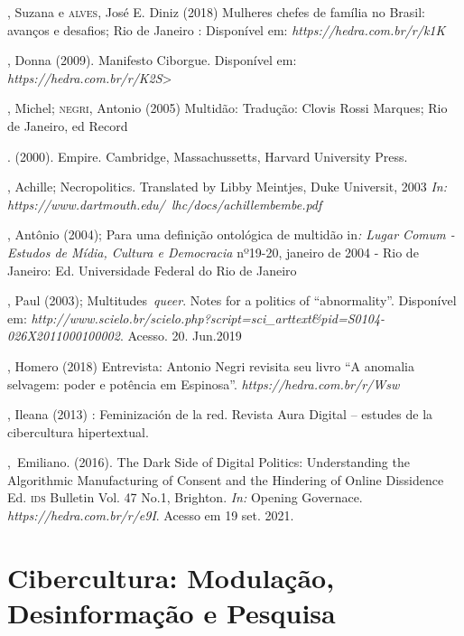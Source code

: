\begin{bibliohedra}
, Suzana e \textsc{alves}, José E. Diniz (2018) Mulheres chefes de
família no Brasil: avanços e desafios; Rio de Janeiro : Disponível em:
\emph{https://hedra.com.br/r/k1K}

, Donna (2009). Manifesto Ciborgue. Disponível em:
\emph{https://hedra.com.br/r/K2S}\textgreater{} %

, Michel; \textsc{negri}, Antonio (2005) Multidão: Tradução: Clovis Rossi
Marques; Rio de Janeiro, ed Record

\titidem. (2000). Empire. Cambridge,
Massachussetts, Harvard University Press.

, Achille; Necropolitics. Translated by Libby Meintjes, Duke
Universit, 2003 \emph{In:}
\emph{https://www.dartmouth.edu/~lhc/docs/achillembembe.pdf} %

, Antônio (2004); Para uma definição ontológica de multidão
in\emph{: Lugar Comum - Estudos de Mídia, Cultura e Democracia} nº19-20,
janeiro de 2004 - Rio de Janeiro: Ed. Universidade Federal do Rio de
Janeiro

, Paul (2003); Multitudes~\emph{queer}. Notes for a politics of
``abnormality''. Disponível em:
\emph{http://www.scielo.br/scielo.php?script=sci\_arttext\&pid=S0104-026X2011000100002}. %
Acesso. 20. Jun.2019

, Homero (2018) Entrevista: Antonio Negri revisita seu livro ``A
anomalia selvagem: poder e potência em Espinosa''.
\emph{https://hedra.com.br/r/Wsw}

, Ileana (2013) : Feminización de la red. Revista Aura
Digital -- estudes de la cibercultura hipertextual.

,~Emiliano. (2016). The Dark Side of Digital Politics:
Understanding the Algorithmic Manufacturing of Consent and the Hindering
of Online Dissidence Ed. \textsc{ids} Bulletin Vol. 47 No.1, Brighton. \emph{In:}
Opening Governace. \emph{https://hedra.com.br/r/e9I}. Acesso em 19 set. 2021.
\end{bibliohedra}

\part{Cibercultura: Modulação, Desinformação e Pesquisa}


